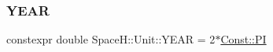 \mbox{\label{namespace_space_h_1_1_unit_a386ecd4744a86ce94e14270b1305fc62}} 
\subsubsection{\texorpdfstring{Y\+E\+AR}{YEAR}}
{\footnotesize\ttfamily constexpr double Space\+H\+::\+Unit\+::\+Y\+E\+AR = 2$\ast$\mbox{\hyperlink{namespace_space_h_1_1_const_afdcc70c6f78ec4cf7baad3525ba7c618}{Const\+::\+PI}}}

